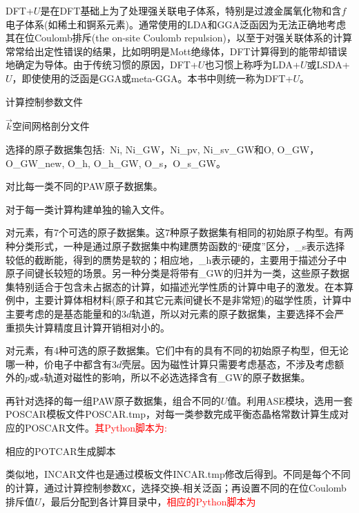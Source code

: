 \textrm{DFT}+$U$是在\textrm{DFT}基础上为了处理强关联电子体系，特别是过渡金属氧化物和含$f$电子体系(如稀土和锕系元素)。通常使用的\textrm{LDA}和\textrm{GGA}泛函因为无法正确地考虑其在位\textrm{Coulomb}排斥\textrm{(the on-site Coulomb repulsion)}，以至于对强关联体系的计算常常给出定性错误的结果，比如明明是\textrm{Mott}绝缘体，\textrm{DFT}计算得到的能带却错误地确定为导体。由于传统习惯的原因，\textrm{DFT}+$U$也习惯上称呼为\textrm{LDA}+$U$或\textrm{LSDA}+$U$，即使使用的泛函是\textrm{GGA}或\textrm{meta-GGA}。本书中则统一称为\textrm{DFT}+$U$。


计算控制参数文件

$\vec k$空间网格剖分文件

选择的原子数据集包括:~\textrm{Ni, Ni\_GW，Ni\_pv, Ni\_sv\_GW和O, O\_GW，O\_GW\_new, O\_h, O\_h\_GW, O\_s，O\_s\_GW}。

对比每一类不同的\textrm{PAW}原子数据集。

对于每一类计算构建单独的输入文件。

对元素，有7个可选的原子数据集。这7种原子数据集有相同的初始原子构型。有两种分类形式，一种是通过原子数据集中构建赝势函数的``硬度''区分，\textrm{\_s}表示选择较低的截断能，得到的赝势是软的；相应地，\textrm{\_h}表示硬的，主要用于描述分子中原子间键长较短的场景。另一种分类是将带有\textrm{\_GW}的归并为一类，这些原子数据集特别适合于包含未占据态的计算，如描述光学性质的计算中电子的激发。在本算例中，主要计算体相材料(原子和其它元素间键长不是非常短)的磁学性质，计算中主要考虑的是基态能量和的$3d$轨道，所以对元素的原子数据集，主要选择不会严重损失计算精度且计算开销相对小的。

对元素，有4种可选的原子数据集。它们中有的具有不同的初始原子构型，但无论哪一种，价电子中都含有$3d$壳层。因为磁性计算只需要考虑基态，不涉及考虑额外的$p$或$s$轨道对磁性的影响，所以不必选选择含有\textrm{\_GW}的原子数据集。

再针对选择的每一组\textrm{PAW}原子数据集，组合不同的$U$值。利用\textrm{ASE}模块，选用一套\textrm{POSCAR}模板文件\textrm{POSCAR.tmp}，对每一类参数完成平衡态晶格常数计算生成对应的\textrm{POSCAR}文件。\textcolor{red}{其\textrm{Python}脚本为:}

相应的\textrm{POTCAR}生成脚本

类似地，\textrm{INCAR}文件也是通过模板文件\textrm{INCAR.tmp}修改后得到。不同是每个不同的计算，通过计算控制参数\texttt{XC}，选择交换-相关泛函；再设置不同的在位\textrm{Coulomb}排斥值$U$，最后分配到各计算目录中，\textcolor{red}{相应的\textrm{Python}脚本为}

